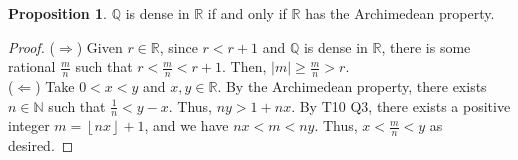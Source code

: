\documentclass[14pt]{article}
\theoremstyle{definition}
\newtheorem{proposition}[definition]{Proposition}
\newcommand{\bb}[1]{\mathbb{#1}}
\begin{document}
\vspace{2mm}

\begin{proposition}
    $\bb{Q}$ is dense in $\bb{R}$ if and only if $\bb{R}$ has the Archimedean property.
\end{proposition}

\begin{proof}
    ($\Rightarrow$) Given $r\in \bb{R}$,  since $r<r+1$ and  $\bb{Q}$ is dense in $\bb{R}$, 
    there is some rational $\frac{m}{n}$ such that $r<\frac{m}{n}<r+1$. Then, 
    $|m|\geq \frac{m}{n}>r $.\\
    ($\Leftarrow$) Take $0<x<y$ and $x, y\in \bb{R}$. By the Archimedean property, there exists
    $n\in\bb{N}$ such that $\frac{1}{n}<y-x$. Thus, $ny>1+nx$. By T10 Q3, there exists a positive
    integer $m=\left \lfloor{nx}\right \rfloor+1 $, and we have $nx<m<ny$. Thus, $x<\frac{m}{n}<y$
    as desired.
\end{proof}
  
  
  
\end{document}
